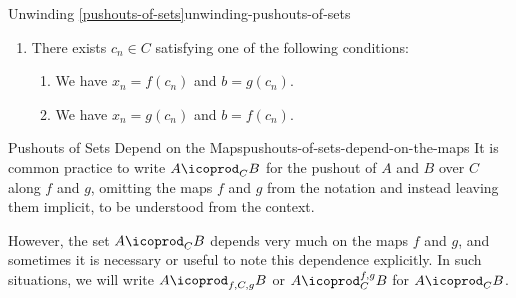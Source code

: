 \begin{remark}{Unwinding \cref{pushouts-of-sets}}{unwinding-pushouts-of-sets}
\begin{enumerate}
\begin{enumerate}
\begin{enumerate}
                        \item\label{unwinding-pushouts-of-sets-3-d-i}We have $x_{i}=f(c_{i})$ and $x_{i+1}=g(c_{i})$.
                        \item\label{unwinding-pushouts-of-sets-3-d-ii}We have $x_{i}=g(c_{i})$ and $x_{i+1}=f(c_{i})$.
                    \end{enumerate}
                \item\label{unwinding-pushouts-of-sets-3-e}There exists $c_{n}\in C$ satisfying one of the following conditions:
                    \begin{enumerate}
                        \item\label{unwinding-pushouts-of-sets-3-e-i}We have $x_{n}=f(c_{n})$ and $b=g(c_{n})$.
                        \item\label{unwinding-pushouts-of-sets-3-e-ii}We have $x_{n}=g(c_{n})$ and $b=f(c_{n})$.
                    \end{enumerate}
            \end{enumerate}
    \end{enumerate}
\end{remark}
\begin{remark}{Pushouts of Sets Depend on the Maps}{pushouts-of-sets-depend-on-the-maps}%
    It is common practice to write $A\icoprod_{C}B$ for the pushout of $A$ and $B$ over $C$ along $f$ and $g$, omitting the maps $f$ and $g$ from the notation and instead leaving them implicit, to be understood from the context.

    \indent However, the set $A\icoprod_{C}B$ depends very much on the maps $f$ and $g$, and sometimes it is necessary or useful to note this dependence explicitly. In such situations, we will write $A\icoprod_{f,C,g}B$ or $A\icoprod^{f,g}_{C}B$ for $A\icoprod_{C}B$.
\end{remark}
